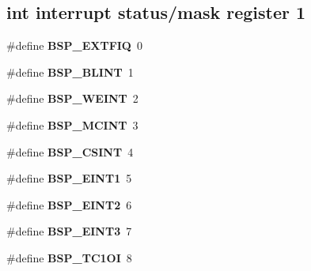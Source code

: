 \subsection*{int interrupt status/mask register 1}
\begin{DoxyCompactItemize}
\item 
\mbox{\label{group__edb7312__interrupt_gae376e5a649c93ae963d3918a7e04f3aa}} 
\#define {\bfseries B\+S\+P\+\_\+\+E\+X\+T\+F\+IQ}~0
\item 
\mbox{\label{group__edb7312__interrupt_ga789aff22f11a248074437e2fc3f7cdd3}} 
\#define {\bfseries B\+S\+P\+\_\+\+B\+L\+I\+NT}~1
\item 
\mbox{\label{group__edb7312__interrupt_ga04c2c40a52f151bc768fbaa722af2c37}} 
\#define {\bfseries B\+S\+P\+\_\+\+W\+E\+I\+NT}~2
\item 
\mbox{\label{group__edb7312__interrupt_ga74f581ead4084044422eb24ae130b548}} 
\#define {\bfseries B\+S\+P\+\_\+\+M\+C\+I\+NT}~3
\item 
\mbox{\label{group__edb7312__interrupt_gadded0b5ebdf270d73f996cffc8fda7fd}} 
\#define {\bfseries B\+S\+P\+\_\+\+C\+S\+I\+NT}~4
\item 
\mbox{\label{group__edb7312__interrupt_gad9cfb55e404270d1f2e89ddcfa73ad7b}} 
\#define {\bfseries B\+S\+P\+\_\+\+E\+I\+N\+T1}~5
\item 
\mbox{\label{group__edb7312__interrupt_ga98eba750ef3e579f28f4b572641a79d9}} 
\#define {\bfseries B\+S\+P\+\_\+\+E\+I\+N\+T2}~6
\item 
\mbox{\label{group__edb7312__interrupt_gacb9ca6b96a421b618a11b24c52ed6508}} 
\#define {\bfseries B\+S\+P\+\_\+\+E\+I\+N\+T3}~7
\item 
\mbox{\label{group__edb7312__interrupt_gaddd10c3ffbe896df327c6bf490a40521}} 
\#define {\bfseries B\+S\+P\+\_\+\+T\+C1\+OI}~8
\item 
\mbox{\label{group__edb7312__interrupt_gaa6c35d2ac2767c2a20c169562d5b6a6a}} 

\end{DoxyCompactItemize}
